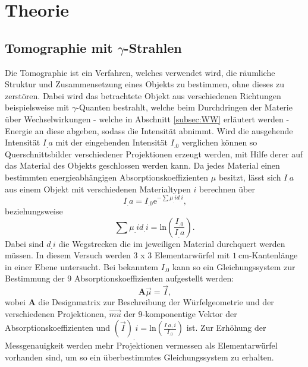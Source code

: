 \section{Theorie}
\label{sec:Theorie}

\subsection{Tomographie mit $\gamma$-Strahlen}
\label{subsec:tomographie}

Die Tomographie ist ein Verfahren, welches verwendet wird, die räumliche Struktur und Zusammensetzung eines Objekts zu bestimmen, ohne dieses zu zerstören. Dabei wird das betrachtete Objekt aus verschiedenen Richtungen beispielsweise mit $\gamma$-Quanten bestrahlt, welche beim Durchdringen der Materie über Wechselwirkungen - welche in Abschnitt \ref{subsec:WW} erläutert werden - Energie an diese abgeben, sodass die Intensität abnimmt. Wird die ausgehende Intensität $I_.a$ mit der eingehenden Intensität $I_.0$ verglichen können so Querschnittsbilder verschiedener Projektionen erzeugt werden, mit Hilfe derer auf das Material des Objekts geschlossen werden kann. Da jedes Material einen bestimmten energieabhängigen Absorptionskoeffizienten $\mu$ besitzt, lässt sich $I_.a$ aus einem Objekt mit verschiedenen Materialtypen $i$ berechnen über
\begin{equation}
I_.a = I_.0\mathrm{e}^{-\sum \mu_.i d_.i}\text{,}\label{eq:Ia}
\end{equation}
beziehungsweise
\begin{equation}
\sum \mu_.i d_.i = \mathrm{ln}\left(\frac{I_.0}{I_.a}\right)\text{.}\label{eq:mu1}
\end{equation}
Dabei sind $d_.i$ die Wegstrecken die im jeweiligen Material durchquert werden müssen.
In diesem Versuch werden 3 x 3 Elementarwürfel mit $\SI{1}{\centi\meter}$-Kantenlänge in einer Ebene untersucht. Bei bekanntem $I_.0$ kann so ein Gleichungssystem zur Bestimmung der 9 Absorptionskoeffizienten aufgestellt werden:
\begin{equation*}
\mathbf{A}\vec{\mu} = \vec{I}\text{,}
\end{equation*}
wobei $\mathbf{A}$ die Designmatrix zur Beschreibung der Würfelgeometrie und der verschiedenen Projektionen, $\vec{mu}$ der 9-komponentige Vektor der Absorptionskoeffizienten und $\left(\vec{I}\right)_.i= \mathrm{ln}\left(\frac{I_.{a,i}}{I_.0}\right)$ ist.
Zur Erhöhung der Messgenauigkeit werden mehr Projektionen vermessen als Elementarwürfel vorhanden sind, um so ein überbestimmtes Gleichungssystem zu erhalten.
